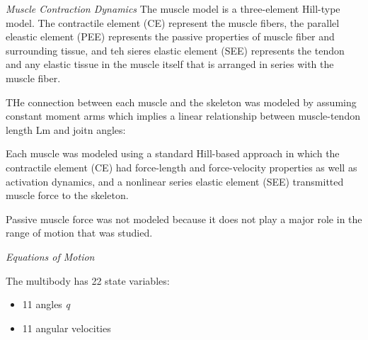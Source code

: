 \textit{Muscle Contraction Dynamics}
The muscle model is a three-element Hill-type model. The contractile element (CE) represent the muscle fibers, the parallel eleastic element (PEE) represents the passive properties of muscle fiber and surrounding tissue, and teh sieres elastic element (SEE) represents the tendon and any elastic tissue in the muscle itself that is arranged in series with the muscle fiber. \cite{RTS}

THe connection between each muscle and the skeleton was modeled by assuming constant moment arms which implies a linear relationship between muscle-tendon length Lm and joitn angles:

Each muscle was modeled using a standard Hill-based approach in which the contractile element (CE) had force-length and force-velocity properties as well as activation dynamics, and a nonlinear series elastic element (SEE) transmitted muscle force to the skeleton. 

Passive muscle force was not modeled because it does not play a major role in the range of motion that was studied. 

\textit{Equations of Motion}

The multibody has 22 state variables:
\begin{itemize}
    \item 11 angles \textit{q}
    \item 11 angular velocities \textit{}
\end{itemize}

